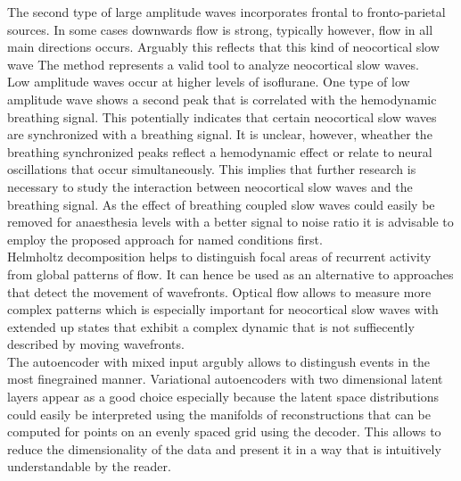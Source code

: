The second type of large amplitude waves incorporates frontal to fronto-parietal sources. In some cases downwards flow is strong, typically however, flow in all main directions occurs. Arguably this reflects that this kind of neocortical slow wave
The method represents a valid tool to analyze neocortical slow waves.\\
Low amplitude waves occur at higher levels of isoflurane. One type of low amplitude wave shows a second peak that is correlated with the hemodynamic breathing signal. This potentially indicates that certain neocortical slow waves are synchronized with a breathing signal. It is unclear, however, wheather the breathing synchronized peaks reflect a hemodynamic effect or relate to neural oscillations that occur simultaneously. This implies that further research is necessary to study the interaction between neocortical slow waves and the breathing signal. As the effect of breathing coupled slow waves could easily be removed for anaesthesia levels with a better signal to noise ratio it is advisable to employ the proposed approach for named conditions first.\\
Helmholtz decomposition helps to distinguish focal areas of recurrent activity from global patterns of flow. It can hence be used as an alternative to approaches that detect the movement of wavefronts. Optical flow allows to measure more complex patterns which is especially important for neocortical slow waves with extended up states that exhibit a complex dynamic that is not suffiecently described by moving wavefronts.\\
The autoencoder with mixed input argubly allows to distingush events in the most finegrained manner. Variational autoencoders with two dimensional latent layers appear as a good choice especially because the latent space distributions could easily be interpreted using the manifolds of reconstructions that can be computed for points on an evenly spaced grid using the decoder. This allows to reduce the dimensionality of the data and present it in a way that is intuitively understandable by the reader.\\
